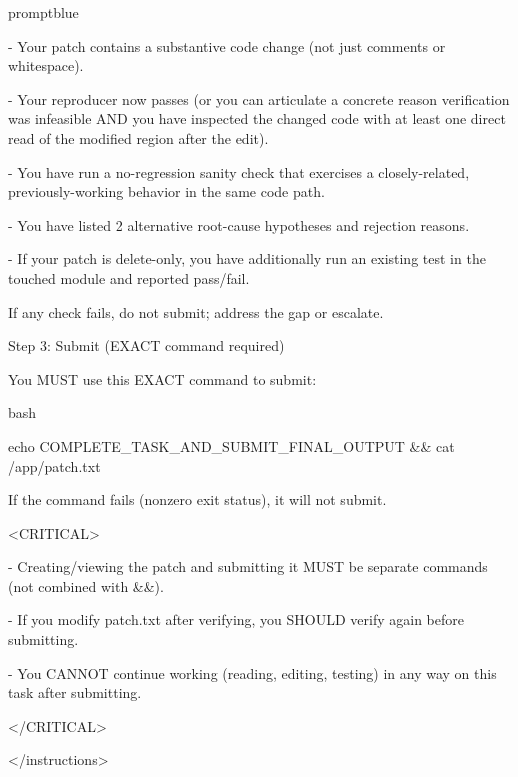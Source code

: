 \documentclass{llmxive}
\begin{document}
\begin{promptbox}{promptblue}
{- Your patch contains a substantive code change (not just comments or whitespace).\par
- Your reproducer now passes (or you can articulate a concrete reason verification was infeasible AND you have inspected the changed code with at least one direct read of the modified region after the edit).\par
- You have run a no-regression sanity check that exercises a closely-related, previously-working behavior in the same code path.\par
- You have listed 2 alternative root-cause hypotheses and rejection reasons.\par
- If your patch is delete-only, you have additionally run an existing test in the touched module and reported pass/fail.\par
\vspace{0.35em}\par
If any check fails, do not submit; address the gap or escalate.\par
\vspace{0.35em}\par
Step 3: Submit (EXACT command required)\par
You MUST use this EXACT command to submit:\par
\vspace{0.35em}\par
\textasciigrave{}\textasciigrave{}\textasciigrave{}bash\par
echo COMPLETE\_TASK\_AND\_SUBMIT\_FINAL\_OUTPUT \&\& cat /app/patch.txt\par
\textasciigrave{}\textasciigrave{}\textasciigrave{}\par
\vspace{0.35em}\par
If the command fails (nonzero exit status), it will not submit.\par
\vspace{0.35em}\par
\textless{}CRITICAL\textgreater{}\par
- Creating/viewing the patch and submitting it MUST be separate commands (not combined with \&\&).\par
- If you modify patch.txt after verifying, you SHOULD verify again before submitting.\par
- You CANNOT continue working (reading, editing, testing) in any way on this task after submitting.\par
\textless{}/CRITICAL\textgreater{}\par
\textless{}/instructions\textgreater{}\par
}
\end{promptbox}
\end{document}
